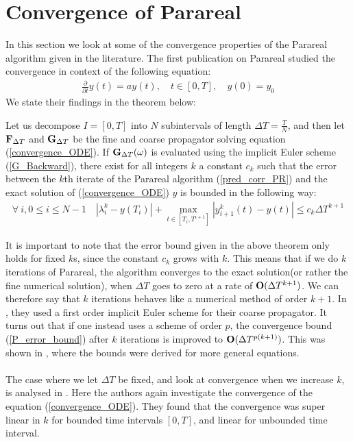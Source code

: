 \section{Convergence of Parareal}
In this section we look at some of the convergence properties of the Parareal algorithm given in the literature. The first publication on Parareal \cite{lions2001resolution} studied the convergence in context of the following equation: 
\begin{align}
\frac{\partial}{\partial t} y(t)=ay(t),\quad t\in [0,T],\quad y(0)=y_0\label{convergence_ODE}
\end{align}
We state their findings in the theorem below:
\begin{theorem}
Let us decompose $I=[0,T]$ into $N$ subintervals of length $\Delta T = \frac{T}{N}$, and then let $\bold F_{\Delta T}$ and $\bold G_{\Delta T}$ be the fine and coarse propagator solving equation (\ref{convergence_ODE}). If $\bold G_{\Delta T}(\omega)$  is evaluated using the implicit Euler scheme (\ref{G_Backward}), there exist for all integers $k$ a constant $c_k$ such that the error between the $k$th iterate of the Parareal algorithm (\ref{pred_corr_PR}) and the exact solution of (\ref{convergence_ODE}) $y$ is bounded in the following way:
\begin{align}
\forall \ i,0\leq i\leq N-1 \quad |\lambda_i^k-y(T_i)| + \max_{t\in[T_{i},T^{i+1}]}|y_{i+1}^k(t)-y(t)| \leq c_k\Delta T^{k+1} \label{P_error_bound}
\end{align}
\end{theorem}
It is important to note that the error bound given in the above theorem only holds for fixed $k$s, since the constant $c_k$ grows with $k$. This means that if we do $k$ iterations of Parareal, the algorithm converges to the exact solution(or rather the fine numerical solution), when $\Delta T$ goes to zero at a rate of $\bold O(\Delta T^{k+1})$. We can therefore say that $k$ iterations behaves like a numerical method of order $k+1$. In \cite{lions2001resolution}, they used a first order implicit Euler scheme for their coarse propagator. It turns out that if one instead uses a scheme of order $p$, the convergence bound (\ref{P_error_bound}) after $k$ iterations is improved to $\bold O(\Delta T^{p(k+1)})$. This was shown in \cite{bal2005convergence}, where the bounds were derived for more general equations. 
\\
\\
The case where we let $\Delta T$ be fixed, and look at convergence when we increase $k$, is analysed in \cite{gander2007analysis}. Here the authors again investigate the convergence of the equation (\ref{convergence_ODE}). They found that the convergence was super linear in $k$ for bounded time intervals $[0,T]$, and linear for unbounded time interval. 
